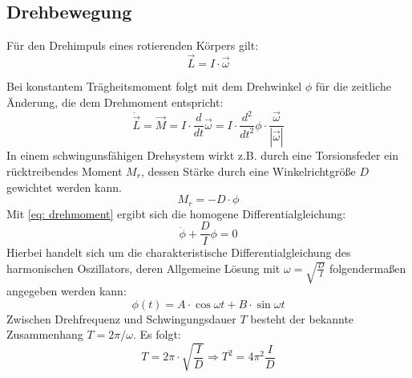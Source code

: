 \subsection{Drehbewegung}
Für den Drehimpuls eines rotierenden Körpers gilt:
\begin{equation}
 \vec{L} = I \cdot \vec{\omega}
\end{equation}

Bei konstantem Trägheitsmoment folgt mit dem Drehwinkel $\phi$ für die zeitliche Änderung, die dem Drehmoment
entspricht:
\begin{equation}
  \dot{\vec{L}} = \vec{M} = I \cdot \frac{d}{dt}\vec{\omega} =
  I \cdot \frac{d^2}{dt^2} \phi \cdot \frac{\vec{\omega}}{|\vec{\omega}|}
  \label{eq: drehmoment}
\end{equation}
In einem schwingunsfähigen Drehsystem wirkt z.B. durch eine Torsionsfeder ein
rücktreibendes Moment $M_{r}$, dessen Stärke durch eine Winkelrichtgröße $D$ gewichtet
werden kann.
\begin{equation}
  M_{r} = - D \cdot \phi
\end{equation}
Mit \eqref{eq: drehmoment} ergibt sich die homogene Differentialgleichung:
\begin{equation}
  \ddot{\phi} + \frac{D}{I}\phi = 0
\end{equation}
Hierbei handelt sich um die charakteristische Differentialgleichung des harmonischen
Oszillators, deren Allgemeine Lösung mit $\omega = \sqrt{\frac{D}{I}}$ folgendermaßen angegeben werden kann:
\begin{equation}
  \phi(t) = A\cdot \cos{\omega t} + B \cdot \sin{\omega t}
\end{equation}
Zwischen Drehfrequenz und Schwingungsdauer $T$ besteht der bekannte Zusammenhang
$T = 2\pi / \omega$. Es folgt:
\begin{equation}
  T = 2\pi \cdot \sqrt{\frac{I}{D}} \Rightarrow T^2 = 4\pi^2 \frac{I}{D}
\end{equation}
